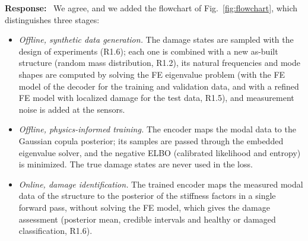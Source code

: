 \documentclass[11pt]{article}
\newenvironment{response}{\par\smallskip\noindent\color{resp}\textbf{Response:}\ }{\par}
\begin{document}
\begin{response}
We agree, and we added the flowchart of Fig.~\ref{fig:flowchart}, which distinguishes three stages:
\begin{itemize}[leftmargin=*]
\item \emph{Offline, synthetic data generation.} The damage states are sampled with the design of experiments (R1.6);
each one is combined with a new as-built structure (random mass distribution, R1.2), its natural frequencies and mode
shapes are computed by solving the FE eigenvalue problem (with the FE model of the decoder for the training and
validation data, and with a refined FE model with localized damage for the test data, R1.5), and measurement noise is
added at the sensors.
\item \emph{Offline, physics-informed training.} The encoder maps the modal data to the Gaussian copula posterior; its
samples are passed through the embedded eigenvalue solver, and the negative ELBO (calibrated likelihood and entropy) is
minimized. The true damage states are never used in the loss.
\item \emph{Online, damage identification.} The trained encoder maps the measured modal data of the structure to the
posterior of the stiffness factors in a single forward pass, without solving the FE model, which gives the damage
assessment (posterior mean, credible intervals and healthy or damaged classification, R1.6).
\end{itemize}
\end{response}
\end{document}
